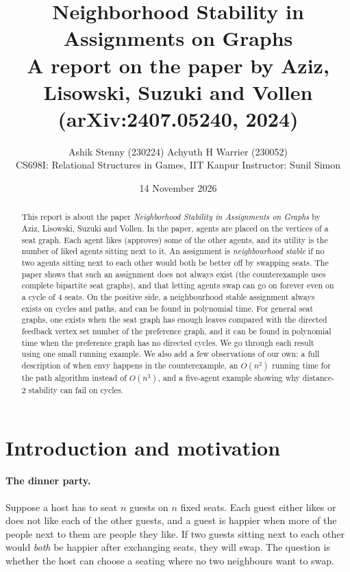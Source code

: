 \documentclass[11pt,a4paper]{article}
\title{\textbf{Neighborhood Stability in Assignments on Graphs}\\[2mm]
\large A report on the paper by Aziz, Lisowski, Suzuki and Vollen (arXiv:2407.05240, 2024)}
\author{Ashik Stenny (230224) \qquad Achyuth H Warrier (230052)\\[1mm]
\small CS698I: Relational Structures in Games, IIT Kanpur \quad Instructor: Sunil Simon}
\date{14 November 2026}
\theoremstyle{definition}
\theoremstyle{remark}
\theoremstyle{plain}
\begin{document}
\maketitle

\begin{abstract}
This report is about the paper \emph{Neighborhood Stability in Assignments on Graphs} by Aziz, Lisowski, Suzuki and Vollen. In the paper, agents are placed on the vertices of a seat graph. Each agent likes (approves) some of the other agents, and its utility is the number of liked agents sitting next to it. An assignment is \emph{neighbourhood stable} if no two agents sitting next to each other would both be better off by swapping seats. The paper shows that such an assignment does not always exist (the counterexample uses complete bipartite seat graphs), and that letting agents swap can go on forever even on a cycle of 4 seats. On the positive side, a neighbourhood stable assignment always exists on cycles and paths, and can be found in polynomial time. For general seat graphs, one exists when the seat graph has enough leaves compared with the directed feedback vertex set number of the preference graph, and it can be found in polynomial time when the preference graph has no directed cycles. We go through each result using one small running example. We also add a few observations of our own: a full description of when envy happens in the counterexample, an $O(n^2)$ running time for the path algorithm instead of $O(n^3)$, and a five-agent example showing why distance-2 stability can fail on cycles.
\end{abstract}

\clearpage
\tableofcontents
\clearpage


\section{Introduction and motivation}

\paragraph{The dinner party.} Suppose a host has to seat $n$ guests on $n$ fixed seats. Each guest either likes or does not like each of the other guests, and a guest is happier when more of the people next to them are people they like. If two guests sitting next to each other would \emph{both} be happier after exchanging seats, they will swap. The question is whether the host can choose a seating where no two neighbours want to swap.
\end{document}
